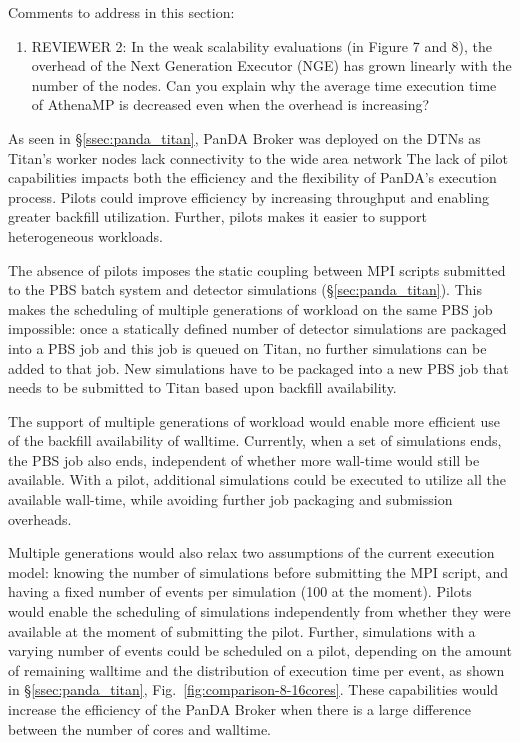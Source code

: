 Comments to address in this section:
\begin{enumerate}
	\item REVIEWER 2: In the weak scalability evaluations (in Figure 7 and
	8), the overhead of the Next Generation Executor (NGE) has grown linearly
	with the number of the nodes. Can you explain why the average time
	execution time of AthenaMP is decreased even when the overhead is
	increasing?
\end{enumerate}

As seen in \S\ref{ssec:panda_titan}, PanDA Broker was  deployed on the DTNs
as Titan's worker nodes lack connectivity to the wide area network The lack
of pilot capabilities impacts both the efficiency and the flexibility of
PanDA's execution process. Pilots could improve efficiency by increasing
throughput and enabling greater backfill utilization. Further, pilots makes
it easier to support heterogeneous workloads.

The absence of pilots imposes the static coupling between MPI scripts
submitted to the PBS batch system and detector simulations
(\S\ref{sec:panda_titan}). This makes the scheduling of multiple generations
of workload on the same PBS job impossible: once a statically defined number
of detector simulations are packaged into a PBS job and this job is queued on
Titan, no further simulations can be added to that job. New simulations have
to be packaged into a new PBS job that needs to be submitted to Titan based
upon backfill availability.

The support of  multiple generations of workload would enable more efficient
use of the backfill availability of walltime. Currently, when a set of
simulations ends, the PBS job also ends, independent of whether more
wall-time would still be available. With a pilot, additional simulations
could be executed  to utilize all the available wall-time, while avoiding
further job packaging and submission overheads.

Multiple generations would also relax two assumptions of the current
execution model: knowing the number of simulations before submitting the MPI
script, and having a fixed number of events per simulation (100 at the
moment). Pilots would enable the scheduling of simulations independently from
whether they were available at the moment of submitting the pilot. Further,
simulations with a varying number of events could be scheduled on a pilot,
depending on the amount of remaining walltime and the distribution of
execution time per event, as shown in \S\ref{ssec:panda_titan},
Fig.~\ref{fig:comparison-8-16cores}. These capabilities would increase the
efficiency of the PanDA Broker when there is a large difference between the
number of cores and walltime.

